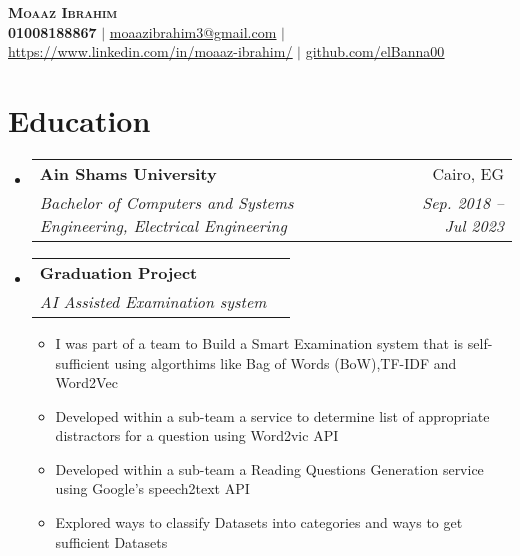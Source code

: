 \documentclass[letterpaper,11pt]{article}
\makeatletter
\newcommand{\resumeItem}[1]{
  \item\small{
    {#1 \vspace{-2pt}}
  }
}
\newcommand{\resumeSubheading}[4]{
  \vspace{-2pt}\item
    \begin{tabular*}{0.97\textwidth}[t]{l@{\extracolsep{\fill}}r}
      \textbf{#1} & #2 \\
      \textit{\small#3} & \textit{\small #4} \\
    \end{tabular*}\vspace{-7pt}
}
\newcommand{\resumeSubHeadingListStart}{\begin{itemize}[leftmargin=0.15in, label={}]}
\newcommand{\resumeSubHeadingListEnd}{\end{itemize}}
\newcommand{\resumeItemListStart}{\begin{itemize}}
\newcommand{\resumeItemListEnd}{\end{itemize}\vspace{-5pt}}
\makeatother
\begin{document}


\begin{center}
    \textbf{\Huge \scshape Moaaz Ibrahim} \\ \vspace{1pt}
    \small \textbf{01008188867} $|$ \href{}{\underline{moaazibrahim3@gmail.com}} $|$ 
    \href{https://linkedin.com/in/moaaz-ibrahim-58990b1b7}{\underline{https://www.linkedin.com/in/moaaz-ibrahim/}} $|$
    \href{https://github.com/elBanna00}{\underline{github.com/elBanna00}}
\end{center}


\section{Education}
  \resumeSubHeadingListStart
    \resumeSubheading
      {Ain Shams University}{Cairo, EG}
      {Bachelor of Computers and Systems Engineering, Electrical Engineering}{Sep. 2018 -- Jul 2023}
    \resumeSubheading
      {Graduation Project}{}
      {AI Assisted Examination system}{}
            \resumeItemListStart
        \resumeItem{I was part of a team to Build a Smart Examination system that is self-sufficient using algorthims like Bag of Words (BoW),TF-IDF and Word2Vec
 }
        \resumeItem{Developed within a sub-team a service to determine list of appropriate distractors for a question using Word2vic API}
        \resumeItem{Developed within a sub-team a Reading Questions Generation service using Google's speech2text API}
        \resumeItem{Explored ways to classify Datasets into categories and ways to get sufficient Datasets}
      \resumeItemListEnd
  \resumeSubHeadingListEnd



      
\end{document}
